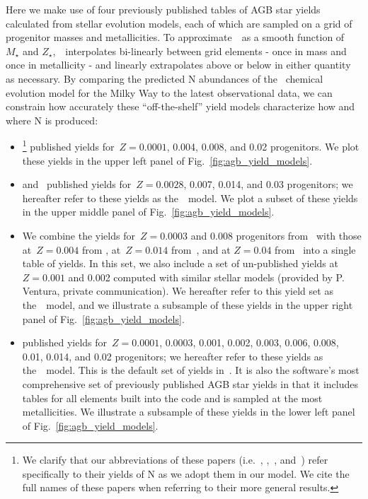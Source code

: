 \documentclass[ms.tex]{subfiles}
\begin{document}
Here we make use of four previously published tables of AGB star yields
calculated from stellar evolution models, each of which are sampled on a grid
of progenitor masses and metallicities.
To approximate~~as a smooth function of~$M_\star$ and
$Z_\star$,~\vice~interpolates bi-linearly between grid elements - once in
mass and once in metallicity - and linearly extrapolates above or below in
either quantity as necessary.
By comparing the predicted N abundances of the~\citet{Johnson2021} chemical
evolution model for the Milky Way to the latest observational data, we can
constrain how accurately these ``off-the-shelf'' yield models characterize
how and where N is produced:
\begin{itemize}
	\item[\textbf{1.}] \citet[][hereafter~\karakasten]{Karakas2010}\footnote{
		We clarify that our abbreviations of these papers (i.e.~\karakasten,
		\karakas,~\ventura, and~\cristallo) refer specifically to their yields
		of N as we adopt them in our model.
		We cite the full names of these papers when referring to their more
		general results.
	} published yields for~$Z = 0.0001$, 0.004, 0.008, and 0.02 progenitors.
	We plot these yields in the upper left panel of 
	Fig.~\ref{fig:agb_yield_models}.

	\item[\textbf{2.}] \citet{Karakas2016} and~\citet{Karakas2018} published
	yields for~$Z = 0.0028$, 0.007, 0.014, and 0.03 progenitors; we hereafter
	refer to these yields as the~\karakas~model.
	We plot a subset of these yields in the upper middle panel of
	Fig.~\ref{fig:agb_yield_models}.

	\item[\textbf{3.}] We combine the yields for~$Z = 0.0003$ and 0.008
	progenitors from~\citet{Ventura2013} with those at~$Z = 0.004$ from
	\citet{Ventura2014}, at~$Z = 0.014$ from~\citet{Ventura2018}, and at
	$Z = 0.04$ from~\citet{Ventura2020} into a single table of yields.
	In this set, we also include a set of un-published yields at~$Z = 0.001$
	and 0.002 computed with similar stellar models (provided by P. Ventura,
	private communication).
	We hereafter refer to this yield set as the~\ventura~model, and we
	illustrate a subsample of these yields in the upper right panel of
	Fig.~\ref{fig:agb_yield_models}.

	\item[\textbf{4.}] \citet{Cristallo2011, Cristallo2015} published yields
	for~$Z = 0.0001$, 0.0003, 0.001, 0.002, 0.003, 0.006, 0.008, 0.01, 0.014,
	and 0.02 progenitors; we hereafter refer to these yields as
	the~\cristallo~model.
	This is the default set of yields in~\vice.
	It is also the software's most comprehensive set of previously published
	AGB star yields in that it includes tables for all elements built into the
	code and is sampled at the most metallicities.
	We illustrate a subsample of these yields in the lower left panel of
	Fig.~\ref{fig:agb_yield_models}.
\end{itemize}
\end{document}
